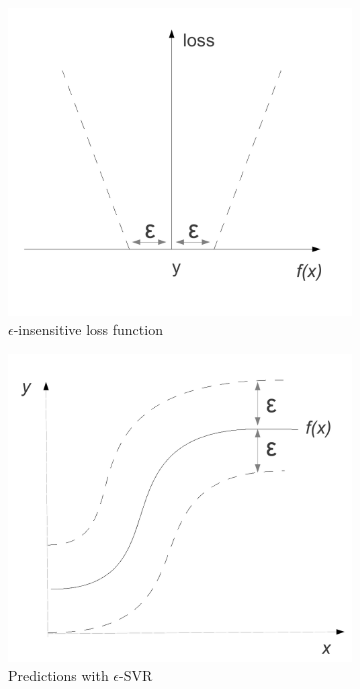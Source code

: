 \documentclass[12pt,notitlepage,twoside]{scrreprt}
\begin{document}
\begin{figure}[h!]
  \centering 
  \begin{subfigure}[b]{0.49\textwidth}
  \includegraphics[width=\linewidth]{figs/loss.pdf}
  \caption{\(\epsilon\)-insensitive loss function}
  \label{eps1} 
\end{subfigure}
  \begin{subfigure}[b]{0.49\textwidth}
  \centering 
  \includegraphics[width=\linewidth]{figs/loss2.pdf}
  \caption{Predictions with \(\epsilon\)-SVR}
  \label{eps2} 
\end{subfigure}
\caption{\label{eps}}
\end{figure}
\end{document}
